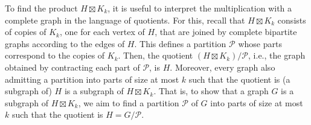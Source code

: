 \documentclass[a4paper,english,cleveref,thm-restate]{lipics-v2021}
\newcommand{\calP}{\ensuremath{\mathcal{P}}\xspace}
\begin{document}
To find the product $ H \boxtimes K_k $, it is useful to interpret the multiplication with a complete graph in the language of quotients.
For this, recall that $ H \boxtimes K_k $ consists of copies of $ K_k $, one for each vertex of $ H $, that are joined by complete bipartite graphs according to the edges of $ H $.
This defines a partition \calP whose parts correspond to the copies of $ K_k $.
Then, the quotient $ (H \boxtimes K_k) / \calP $, i.e., the graph obtained by contracting each part of \calP, is $ H $.
Moreover, every graph also admitting a partition into parts of size at most $ k $ such that the quotient is (a subgraph of) $ H $ is a subgraph of $ H \boxtimes K_k $.
That is, to show that a graph $ G $ is a subgraph of $ H \boxtimes K_k $, we aim to find a partition \calP of $ G $ into parts of size at most $ k $ such that the quotient is $ H = G / \calP $.
\end{document}

